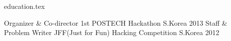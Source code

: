 {education.tex}
\begin{cvhonors}
  \cvhonor
    {Organizer \& Co-director}
    {1st POSTECH Hackathon}
    {S.Korea}
    {2013}
  \cvhonor
    {Staff \& Problem Writer}
    {JFF(Just for Fun) Hacking Competition}
    {S.Korea}
    {2012}
\end{cvhonors}
